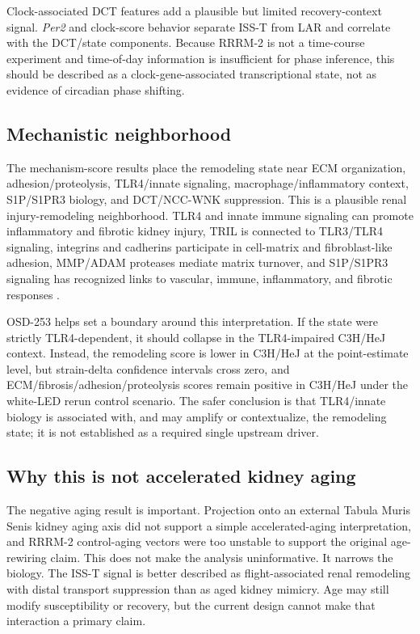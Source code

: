 \documentclass[11pt]{article}
\newcommand{\gene}[1]{\textit{#1}}
\begin{document}
Clock-associated DCT features add a plausible but limited recovery-context signal. \gene{Per2} and clock-score behavior separate ISS-T from LAR and correlate with the DCT/state components. Because RRRM-2 is not a time-course experiment and time-of-day information is insufficient for phase inference, this should be described as a clock-gene-associated transcriptional state, not as evidence of circadian phase shifting.

\subsection{Mechanistic neighborhood}

The mechanism-score results place the remodeling state near ECM organization, adhesion/proteolysis, TLR4/innate signaling, macrophage/inflammatory context, S1P/S1PR3 biology, and DCT/NCC-WNK suppression. This is a plausible renal injury-remodeling neighborhood. TLR4 and innate immune signaling can promote inflammatory and fibrotic kidney injury, TRIL is connected to TLR3/TLR4 signaling, integrins and cadherins participate in cell-matrix and fibroblast-like adhesion, MMP/ADAM proteases mediate matrix turnover, and S1P/S1PR3 signaling has recognized links to vascular, immune, inflammatory, and fibrotic responses \citep{souza2015tlr4,carpenter2009tril,carpenter2011tril,wochal2014tril,s1p2017,s1p2020,s1p2009}.

OSD-253 helps set a boundary around this interpretation. If the state were strictly TLR4-dependent, it should collapse in the TLR4-impaired C3H/HeJ context. Instead, the remodeling score is lower in C3H/HeJ at the point-estimate level, but strain-delta confidence intervals cross zero, and ECM/fibrosis/adhesion/proteolysis scores remain positive in C3H/HeJ under the white-LED rerun control scenario. The safer conclusion is that TLR4/innate biology is associated with, and may amplify or contextualize, the remodeling state; it is not established as a required single upstream driver.

\subsection{Why this is not accelerated kidney aging}

The negative aging result is important. Projection onto an external Tabula Muris Senis kidney aging axis did not support a simple accelerated-aging interpretation, and RRRM-2 control-aging vectors were too unstable to support the original age-rewiring claim. This does not make the analysis uninformative. It narrows the biology. The ISS-T signal is better described as flight-associated renal remodeling with distal transport suppression than as aged kidney mimicry. Age may still modify susceptibility or recovery, but the current design cannot make that interaction a primary claim.
\end{document}
